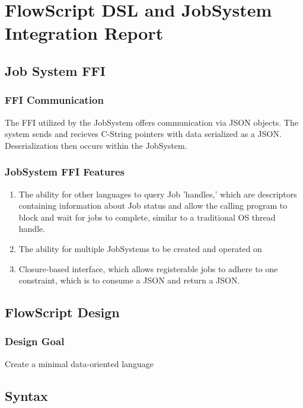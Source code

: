 \documentclass{article}
\begin{document}
\section*{FlowScript DSL and JobSystem Integration Report}
	\subsection{Job System FFI}
		\subsubsection{FFI Communication}
			The FFI utilized by the JobSystem offers communication via JSON objects. The system sends and recieves C-String pointers with data serialized as a JSON. Deserialization then occurs within the JobSystem.
		\subsubsection{JobSystem FFI Features}
			\begin{enumerate}
				\item The ability for other languages to query Job 'handles,' which are descriptors containing information about Job status and allow the calling program to block and wait for jobs to complete, similar to a traditional OS thread handle.
				\item The ability for multiple JobSystems to be created and operated on
				\item Closure-based interface, which allows registerable jobs to adhere to one constraint, which is to consume a JSON and return a JSON.
			\end{enumerate}
	\subsection{FlowScript Design}
		\subsubsection{Design Goal}
			Create a minimal data-oriented language
		\subsection{Syntax}
\end{document}
